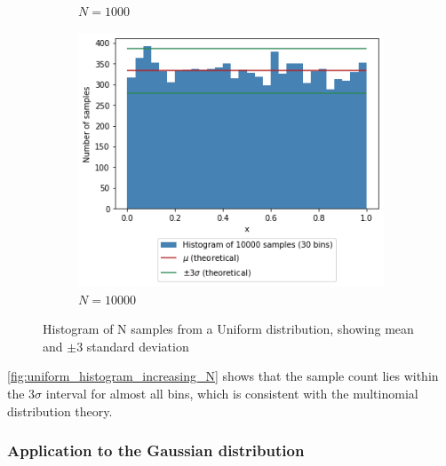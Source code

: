 \documentclass[a4paper]{article}
\begin{document}
\begin{figure}[h]
\begin{subfigure}[b]{0.3\textwidth}
        \caption{$N=1000$}
        \label{fig:uniform_histogram_1000}
    \end{subfigure}
    \hfill
    \begin{subfigure}[b]{0.3\textwidth}
        \centering
        \includegraphics[width=\textwidth]{figures/uniform_histogram_10000.png}
        \caption{$N=10000$}
        \label{fig:uniform_histogram_10000}
    \end{subfigure}
    \caption{Histogram of N samples from a Uniform distribution, showing mean and $\pm3$ standard deviation}
    \label{fig:uniform_histogram_increasing_N}
\end{figure}

\autoref{fig:uniform_histogram_increasing_N} shows that the sample count lies within the $3\sigma$ interval for almost
all bins, which is consistent with the multinomial distribution theory.


\subsubsection{Application to the Gaussian distribution}
\end{document}
